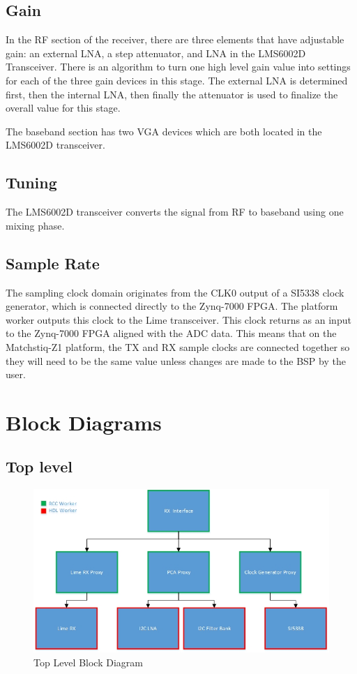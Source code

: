 \documentclass{article}
\begin{document}
\subsection*{Gain}
In the RF section of the receiver, there are three elements that have adjustable gain: an external LNA, a step attenuator, and LNA in the LMS6002D Transceiver.  There is an algorithm to turn one high level gain value into settings for each of the three gain devices in this stage.  The external LNA is determined first, then the internal LNA, then finally the attenuator is used to finalize the overall value for this stage.\par\medskip
\noindent The baseband section has two VGA devices which are both located in the LMS6002D transceiver.
\subsection*{Tuning}
The LMS6002D transceiver converts the signal from RF to baseband using one mixing phase.
\subsection*{Sample Rate}
The sampling clock domain originates from  the CLK0 output of a SI5338 clock generator, which is connected directly to the Zynq-7000 FPGA. The platform worker outputs this clock to the Lime transceiver.  This clock returns as an input to the Zynq-7000 FPGA aligned with the ADC data. This means that on the Matchstiq-Z1 platform, the TX and RX sample clocks are connected together so they will need to be the same value unless changes are made to the BSP by the user.

\section*{Block Diagrams}
\subsection*{Top level}
\begin{figure}[ht]
	\centerline{\includegraphics[scale=0.7]{matchstiq_FE_RX_toplevel}}
	\caption{Top Level Block Diagram}
	\label{fig:top}
\end{figure}
\vspace{25 mm}
\end{document}
